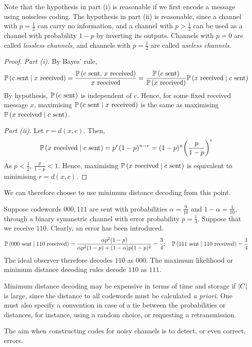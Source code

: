 Note that the hypothesis in part (i) is reasonable if we first encode a message using noiseless coding.
The hypothesis in part (ii) is reasonable, since a channel with \( p = \frac{1}{2} \) can carry no information, and a channel with \( p > \frac{1}{2} \) can be used as a channel with probability \( 1 - p \) by inverting its outputs.
Channels with \( p = 0 \) are called \emph{lossless channels}, and channels with \( p = \frac{1}{2} \) are called \emph{useless channels}.
\begin{proof}
    \emph{Part (i).}
    By Bayes' rule,
    \[ \mathbb{P}\left({c \text{ sent} \mid x \text{ received}}\right) = \frac{\mathbb{P}\left({c \text{ sent, } x \text{ received}}\right)}{x \text{ received}} = \frac{\mathbb{P}\left({c \text{ sent}}\right)}{\mathbb{P}\left({x \text{ received}}\right)} \mathbb{P}\left({x \text{ received} \mid c \text{ sent}}\right) \]
    By hypothesis, \( \mathbb{P}\left({c \text{ sent}}\right) \) is independent of \( c \).
    Hence, for some fixed received message \( x \), maximising \( \mathbb{P}\left({c \text{ sent} \mid x \text{ received}}\right) \) is the same as maximising \( \mathbb{P}\left({x \text{ received} \mid c \text{ sent}}\right) \).

    \emph{Part (ii).}
    Let \( r = d(x,c) \).
    Then,
    \[ \mathbb{P}\left({x \text{ received} \mid c \text{ sent}}\right) = p^r (1-p)^{n-r} = (1-p)^n \qty(\frac{p}{1-p})^r \]
    As \( p < \frac{1}{2} \), \( \frac{p}{1-p} < 1 \).
    Hence, maximising \( \mathbb{P}\left({x \text{ received} \mid c \text{ sent}}\right) \) is equivalent to minimising \( r = d(x,c) \).
\end{proof}
We can therefore choose to use minimum distance decoding from this point.
\begin{example}
    Suppose codewords \( 000, 111 \) are sent with probabilities \( \alpha = \frac{9}{10} \) and \( 1 - \alpha = \frac{1}{10} \), through a binary symmetric channel with error probability \( p = \frac{1}{4} \).
    Suppose that we receive \( 110 \).
    Clearly, an error has been introduced.
    \[ \mathbb{P}\left({000 \text{ sent} \mid 110 \text{ received}}\right) = \frac{\alpha p^2 (1-p)}{\alpha p^2 (1-p) + (1-\alpha)p(1-p)^2} = \frac{3}{4};\quad \mathbb{P}\left({111 \text{ sent} \mid 110 \text{ received}}\right) = \frac{1}{4} \]
    The ideal observer therefore decodes \( 110 \) as \( 000 \).
    The maximum likelihood or minimum distance decoding rules decode \( 110 \) as \( 111 \).
\end{example}
\begin{remark}
    Minimum distance decoding may be expensive in terms of time and storage if \( \abs{C} \) is large, since the distance to all codewords must be calculated \emph{a priori}.
    One must also specify a convention in case of a tie between the probabilities or distances, for instance, using a random choice, or requesting a retransmission.
\end{remark}
The aim when constructing codes for noisy channels is to detect, or even correct, errors.

